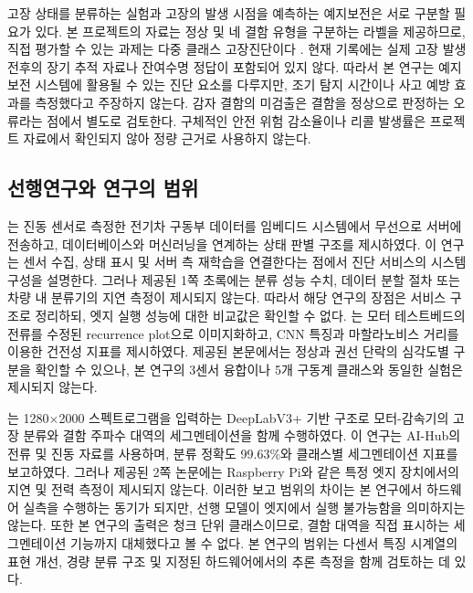 \documentclass[11pt,a4paper]{article}
\begin{document}
고장 상태를 분류하는 실험과 고장의 발생 시점을 예측하는 예지보전은 서로 구분할 필요가 있다.
본 프로젝트의 자료는 정상 및 네 결함 유형을 구분하는 라벨을 제공하므로, 직접 평가할 수 있는 과제는 다중 클래스 고장진단이다 \citep{aihub2022}.
현재 기록에는 실제 고장 발생 전후의 장기 추적 자료나 잔여수명 정답이 포함되어 있지 않다.
따라서 본 연구는 예지보전 시스템에 활용될 수 있는 진단 요소를 다루지만, 조기 탐지 시간이나 사고 예방 효과를 측정했다고 주장하지 않는다.
감자 결함의 미검출은 결함을 정상으로 판정하는 오류라는 점에서 별도로 검토한다.
구체적인 안전 위험 감소율이나 리콜 발생률은 프로젝트 자료에서 확인되지 않아 정량 근거로 사용하지 않는다.

\subsection{선행연구와 연구의 범위}
\citet{ku2023}는 진동 센서로 측정한 전기차 구동부 데이터를 임베디드 시스템에서 무선으로 서버에 전송하고, 데이터베이스와 머신러닝을 연계하는 상태 판별 구조를 제시하였다.
이 연구는 센서 수집, 상태 표시 및 서버 측 재학습을 연결한다는 점에서 진단 서비스의 시스템 구성을 설명한다.
그러나 제공된 1쪽 초록에는 분류 성능 수치, 데이터 분할 절차 또는 차량 내 분류기의 지연 측정이 제시되지 않는다.
따라서 해당 연구의 장점은 서비스 구조로 정리하되, 엣지 실행 성능에 대한 비교값은 확인할 수 없다.
\citet{jung2022}는 모터 테스트베드의 전류를 수정된 recurrence plot으로 이미지화하고, CNN 특징과 마할라노비스 거리를 이용한 건전성 지표를 제시하였다.
제공된 본문에서는 정상과 권선 단락의 심각도별 구분을 확인할 수 있으나, 본 연구의 3센서 융합이나 5개 구동계 클래스와 동일한 실험은 제시되지 않는다.

\citet{park2024}는 1280$\times$2000 스펙트로그램을 입력하는 DeepLabV3+ 기반 구조로 모터-감속기의 고장 분류와 결함 주파수 대역의 세그멘테이션을 함께 수행하였다.
이 연구는 AI-Hub의 전류 및 진동 자료를 사용하며, 분류 정확도 99.63\%와 클래스별 세그멘테이션 지표를 보고하였다.
그러나 제공된 2쪽 논문에는 Raspberry Pi와 같은 특정 엣지 장치에서의 지연 및 전력 측정이 제시되지 않는다.
이러한 보고 범위의 차이는 본 연구에서 하드웨어 실측을 수행하는 동기가 되지만, 선행 모델이 엣지에서 실행 불가능함을 의미하지는 않는다.
또한 본 연구의 출력은 청크 단위 클래스이므로, 결함 대역을 직접 표시하는 세그멘테이션 기능까지 대체했다고 볼 수 없다.
본 연구의 범위는 다센서 특징 시계열의 표현 개선, 경량 분류 구조 및 지정된 하드웨어에서의 추론 측정을 함께 검토하는 데 있다.
\end{document}
